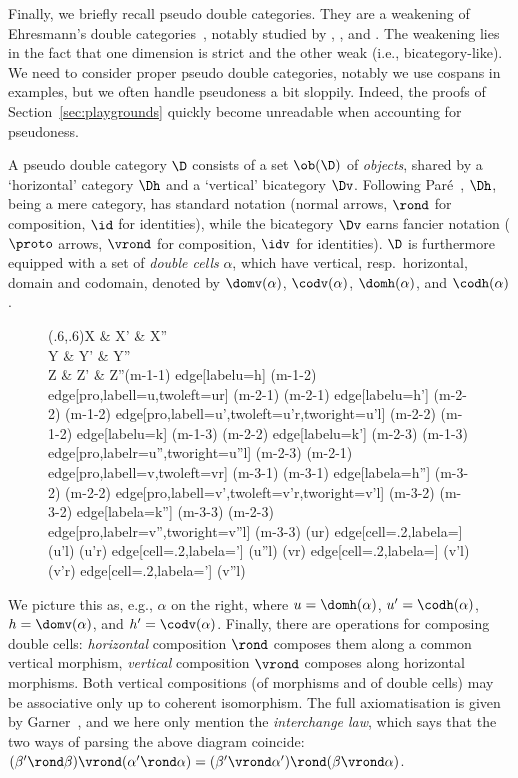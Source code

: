 \documentclass{LMCS}
\theoremstyle{plain}\newtheorem{satz}[thm]{Satz}
\begin{document}
Finally, we briefly recall pseudo double categories. They are a
weakening of Ehresmann's double
categories~\citep{Ehresmann:double,Ehresmann:double2}, notably studied
by \citet{GrandisPare,GrandisPareAdjoints}, \citet{LeinsterHC}, and
\citet{GarnerPhD}.  The weakening lies in the fact that one dimension
is strict and the other weak (i.e., bicategory-like).  We need to
consider proper pseudo double categories, notably we use cospans in
examples, but we often handle pseudoness a bit sloppily.  Indeed, the
proofs of Section~\ref{sec:playgrounds} quickly become unreadable when
accounting for pseudoness.


A pseudo double category $\D$ consists of a set $\ob (\D)$ of
\emph{objects}, shared by a `horizontal' category $\Dh$ and a
`vertical' bicategory $\Dv$. Following Paré~\cite{PareYoneda}, $\Dh$,
being a mere category, has standard notation (normal arrows, $\rond$
for composition, $\id$ for identities), while the bicategory $\Dv$
earns fancier notation ($\proto$ arrows, $\vrond$ for composition,
$\idv$ for identities). $\D$ is furthermore equipped with a set of
\emph{double cells} $\alpha$, which have vertical, resp.\ horizontal,
domain and codomain, denoted by $\domv (\alpha)$, $\codv (\alpha)$,
$\domh (\alpha)$, and $\codh (\alpha)$. 

\begin{wrapfigure}[6]{r}{0pt}
  \begin{minipage}[t][3em]{0.28\linewidth}
    \vspace*{-1.6em}\Diag(.6,.6){}{X \& X' \& X'' \\
    Y \& Y' \& Y'' \\
    Z \& Z' \& Z''}{(m-1-1) edge[labelu={h}] (m-1-2) edge[pro,labell={u},twoleft={ur}{}] (m-2-1) (m-2-1) edge[labelu={h'}] (m-2-2) (m-1-2) edge[pro,labell={u'},twoleft={u'r}{},tworight={u'l}{}] (m-2-2) (m-1-2) edge[labelu={k}] (m-1-3) (m-2-2) edge[labelu={k'}] (m-2-3) (m-1-3) edge[pro,labelr={u''},tworight={u''l}{}] (m-2-3) (m-2-1) 
    edge[pro,labell={v},twoleft={vr}{}] (m-3-1) (m-3-1) edge[labela={h''}] (m-3-2) (m-2-2) edge[pro,labell={v'},twoleft={v'r}{},tworight={v'l}{}] (m-3-2) (m-3-2) edge[labela={k''}] (m-3-3) (m-2-3) edge[pro,labelr={v''},tworight={v''l}{}] (m-3-3) (ur) edge[cell={.2},labela={\alpha}] (u'l) (u'r) edge[cell={.2},labela={\alpha'}] (u''l) (vr) edge[cell={.2},labela={\beta}] (v'l) (v'r) edge[cell={.2},labela={\beta'}] (v''l) }
  \end{minipage}
\end{wrapfigure}
We picture this as, e.g., $\alpha$ on the right, where $u =
\domh (\alpha)$, $u' = \codh (\alpha)$, $h = \domv (\alpha)$, and $h'
= \codv (\alpha)$. Finally, there are operations for composing double
cells: \emph{horizontal} composition $\rond$ composes them along a
common vertical morphism, \emph{vertical} composition $\vrond$
composes along horizontal morphisms. Both vertical compositions (of
morphisms and of double cells) may be associative only up to coherent
isomorphism. The full axiomatisation is given by
Garner~\cite{GarnerPhD}, and we here only mention the
\emph{interchange law}, which says that the two ways of parsing the
above diagram coincide: $(\beta' \rond \beta) \vrond (\alpha' \rond
\alpha) = (\beta' \vrond \alpha') \rond (\beta \vrond \alpha)$.
\end{document}
